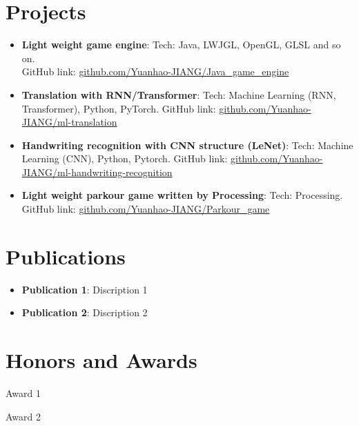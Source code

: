 \documentclass[12pt, a4paper]{article}
\newcommand{\resumeItem}[2]{
  \item\small{
    \textbf{#1}{#2 \vspace{-2pt}}
  }
}
\newcommand{\resumeSubItem}[2]{\resumeItem{#1}{#2}\vspace{-3pt}}
\newcommand{\resumeSubHeadingListStart}{\begin{itemize}[leftmargin=*]}
\newcommand{\resumeSubHeadingListEnd}{\end{itemize}}
\begin{document}
\vspace{-5pt}
\section{Projects}
\resumeSubHeadingListStart
\resumeSubItem{Light weight game engine}{: Tech: Java, LWJGL, OpenGL, GLSL and so on.\\
GitHub link: \href{https://github.com/Yuanhao-JIANG/Java\_game\_engine}{github.com/Yuanhao-JIANG/Java\_game\_engine}}
\vspace{2pt}
\resumeSubItem{Translation with RNN/Transformer}
{: Tech: Machine Learning (RNN, Transformer), Python, PyTorch.
GitHub link: \href{https://github.com/Yuanhao-JIANG/ml-translation}{github.com/Yuanhao-JIANG/ml-translation}}
\resumeSubItem{Handwriting recognition with CNN structure (LeNet)}
{: Tech: Machine Learning (CNN), Python, Pytorch.
GitHub link: \href{https://github.com/Yuanhao-JIANG/ml-handwriting-recognition}
{github.com/Yuanhao-JIANG/ml-handwriting-recognition}}
\resumeSubItem{Light weight parkour game written by Processing}{: Tech: Processing.
GitHub link: \href{https://github.com/Yuanhao-JIANG/Parkour_game}{github.com/Yuanhao-JIANG/Parkour\_game}}
\resumeSubHeadingListEnd
\vspace{-5pt}
\section{Publications}
\resumeSubHeadingListStart
\resumeSubItem{Publication 1}{: Discription 1}
\vspace{2pt}
\resumeSubItem{Publication 2}{: Discription 2}
\resumeSubHeadingListEnd
\vspace{-5pt}
\section{Honors and Awards}
\begin{description}[font=$\bullet$]
\item {Award 1}
\vspace{-5pt}
\item {Award 2}
\end{description}
\end{document}
